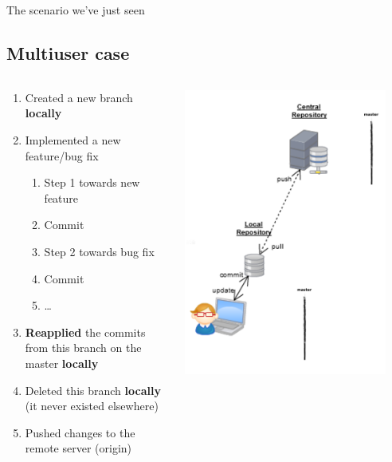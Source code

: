 \begin{frame}[fragile]{The scenario we've just seen}

\subsection{Multiuser case}
\begin{columns}
\begin{column}{0.6\textwidth}
	\tiny
	\begin{enumerate}
		\item<2> Created a new branch \textbf{locally}
		\item<3-4> Implemented a new feature/bug fix
		\begin{enumerate}
			\tiny
			\item<3> Step 1 towards new feature
			\item<3> Commit
			\item<4> Step 2 towards bug fix
			\item<4> Commit
			\item<4> \ldots
		\end{enumerate}
		\item<5> \textbf{Reapplied} the commits from this branch on the master \textbf{locally}
		\item<6> Deleted this branch \textbf{locally} (it never existed elsewhere)
		\item<7> Pushed changes to the remote server (origin)
	\end{enumerate}
\end{column}
\begin{column}{0.4\textwidth}
	\begin{center}
			 {
				\includegraphics[width=0.9\textwidth]{branch_a.png}
}
\end{center}
\end{column}
\end{columns}
\end{frame}

